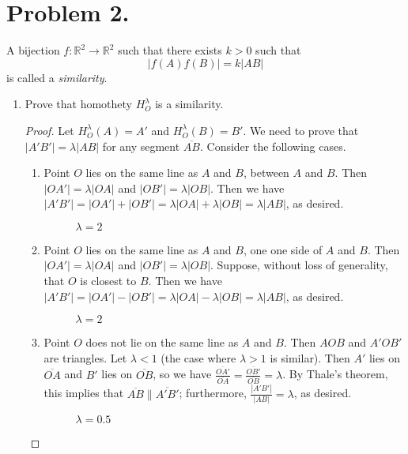 \documentclass{article}
\begin{document}
\section{Problem 2.}
A bijection $f \colon \mathbb{R}^2\rightarrow \mathbb{R}^2$ such that there exists $k>0$ such that
\[|f(A)f(B)|=k|AB|\]
is called a {\it similarity}.
\begin{enumerate}[label=(\alph*)]
    \item Prove that homothety $H_O^{\lambda}$ is a similarity. \label{2c}
    \begin{proof}
    Let $H_O^{\lambda}(A)=A'$ and $H_O^{\lambda}(B)=B'$. We need to prove that $|A'B'|=\lambda|AB|$ for any segment $\overline{AB}$. Consider the following cases.
    \begin{enumerate}[label=(\alph*)]
        \item Point $O$ lies on the same line as $A$ and $B$, between $A$ and $B$. Then $|OA'|=\lambda|OA|$ and $|OB'|=\lambda|OB|$. Then we have $|A'B'|=|OA'|+|OB'|=\lambda|OA|+\lambda|OB|=\lambda|AB|$, as desired.
        
        \begin{figure}[h]
            \centering
            
            \caption{$\lambda=2$}
        \end{figure}
        
        \item Point $O$ lies on the same line as $A$ and $B$, one one side of $A$ and $B$. Then $|OA'|=\lambda|OA|$ and $|OB'|=\lambda|OB|$. Suppose, without loss of generality, that $O$ is closest to $B$. Then we have $|A'B'|=|OA'|-|OB'|=\lambda|OA|-\lambda|OB|=\lambda|AB|$, as desired.
        
        \begin{figure}[h]
            \centering
            
            \caption{$\lambda=2$}
        \end{figure}
        
        \item Point $O$ does not lie on the same line as $A$ and $B$. Then $AOB$ and $A'OB'$ are triangles. Let $\lambda<1$ (the case where $
        \lambda>1$ is similar). Then $A'$ lies on $\overline{OA}$ and $B'$ lies on $\overline{OB}$, so we have $\frac{\overline{OA'}}{\overline{OA}}=\frac{\overline{OB'}}{\overline{OB}}=\lambda$. By Thale's theorem, this implies that $\overline{AB}\parallel \overline{A'B'}$; furthermore, $\frac{|A'B'|}{|AB|}=\lambda$, as desired.
        
        \begin{figure}[h]
            \centering
            
            \caption{$\lambda=0.5$}
        \end{figure}
        

\end{enumerate}
\end{proof}
\end{enumerate}
\end{document}
